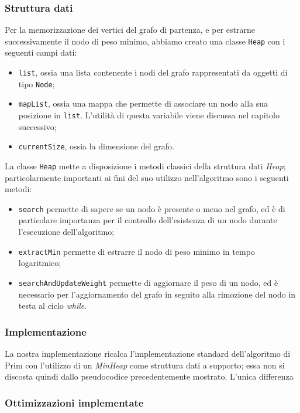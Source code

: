 \subsubsection{Struttura dati}

Per la memorizzazione dei vertici del grafo di partenza, e per estrarne successivamente il nodo di peso minimo, abbiamo 
creato una classe \texttt{Heap} con i seguenti campi dati:
\begin{itemize}
    \item \texttt{list}, ossia una lista contenente i nodi del grafo rappresentati da oggetti di tipo \texttt{Node};
    \item \texttt{mapList}, ossia una mappa che permette di associare un nodo alla sua posizione in \texttt{list}. L'utilità
    di questa variabile viene discussa nel capitolo successivo;
    \item \texttt{currentSize}, ossia la dimensione del grafo.
\end{itemize}
La classe \texttt{Heap} mette a disposizione i metodi classici della struttura dati \textit{Heap}; particolarmente importanti 
ai fini del suo utilizzo nell'algoritmo sono i seguenti metodi:
\begin{itemize}
    \item \texttt{search} permette di sapere se un nodo è presente o meno nel grafo, ed è di particolare importanza
    per il controllo dell'esistenza di un nodo durante l'esecuzione dell'algoritmo;
    \item \texttt{extractMin} permette di estrarre il nodo di peso minimo in tempo logaritmico;
    \item \texttt{searchAndUpdateWeight} permette di aggiornare il peso di un nodo, ed è necessario
    per l'aggiornamento del grafo in seguito alla rimozione del nodo in testa al ciclo \textit{while}.
\end{itemize}

\subsubsection{Implementazione}
La nostra implementazione ricalca l'implementazione standard dell'algoritmo di Prim con l'utilizzo di un 
\textit{MinHeap} come struttura dati a supporto; essa non si discosta quindi dallo pseudocodice precedentemente mostrato.
L'unica differenza 


\subsubsection{Ottimizzazioni implementate}


